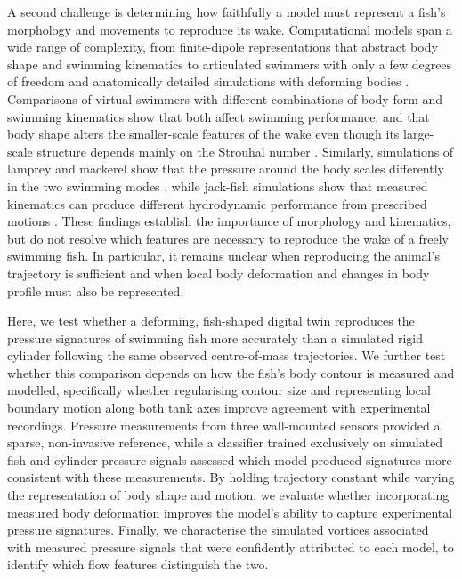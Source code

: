 \documentclass[openacc]{rsproca_new}
\begin{document}
A second challenge is determining how faithfully a model must represent a fish's morphology and movements to reproduce its wake. Computational models span a wide range of complexity, from finite-dipole representations that abstract body shape and swimming kinematics \cite{gazzola2015} to articulated swimmers with only a few degrees of freedom \cite{jiao2021} and anatomically detailed simulations with deforming bodies \cite{borazjani2010,daghooghi2025,khalid2021}. Comparisons of virtual swimmers with different combinations of body form and swimming kinematics show that both affect swimming performance, and that body shape alters the smaller-scale features of the wake even though its large-scale structure depends mainly on the Strouhal number \cite{borazjani2010}. Similarly, simulations of lamprey and mackerel show that the pressure around the body scales differently in the two swimming modes \cite{daghooghi2025}, while jack-fish simulations show that measured kinematics can produce different hydrodynamic performance from prescribed motions \cite{khalid2021}. These findings establish the importance of morphology and kinematics, but do not resolve which features are necessary to reproduce the wake of a freely swimming fish. In particular, it remains unclear when reproducing the animal's trajectory is sufficient and when local body deformation and changes in body profile must also be represented.

Here, we test whether a deforming, fish-shaped digital twin reproduces the pressure signatures of swimming fish more accurately than a simulated rigid cylinder following the same observed centre-of-mass trajectories. We further test whether this comparison depends on how the fish's body contour is measured and modelled, specifically whether regularising contour size and representing local boundary motion along both tank axes improve agreement with experimental recordings. Pressure measurements from three wall-mounted sensors provided a sparse, non-invasive reference, while a classifier trained exclusively on simulated fish and cylinder pressure signals assessed which model produced signatures more consistent with these measurements. By holding trajectory constant while varying the representation of body shape and motion, we evaluate whether incorporating measured body deformation improves the model's ability to capture experimental pressure signatures. Finally, we characterise the simulated vortices associated with measured pressure signals that were confidently attributed to each model, to identify which flow features distinguish the two.
\end{document}
